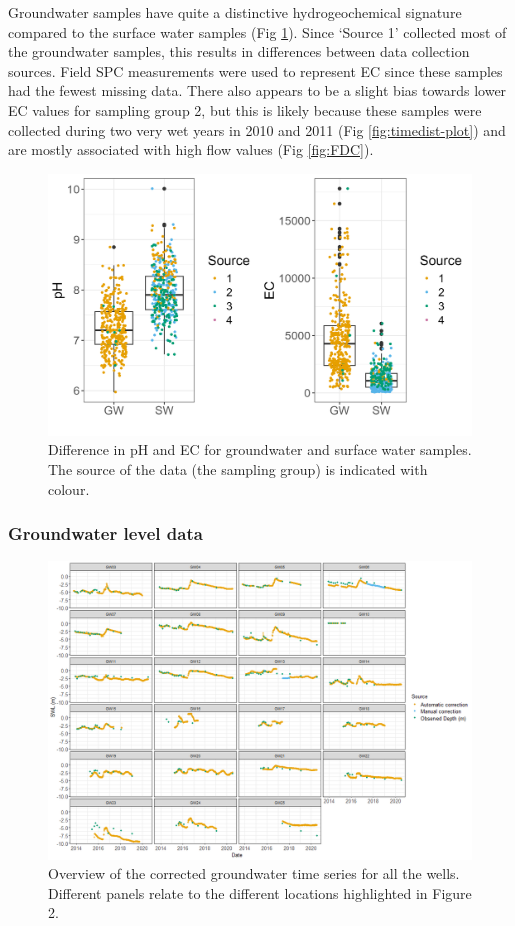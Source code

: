 \documentclass[, manuscript]{copernicus}
\begin{document}
Groundwater samples have quite a distinctive hydrogeochemical signature
compared to the surface water samples (Fig \ref{fig:gw_sw-plot}). Since
`Source 1' collected most of the groundwater samples, this results in
differences between data collection sources. Field SPC measurements were
used to represent EC since these samples had the fewest missing data.
There also appears to be a slight bias towards lower EC values for
sampling group 2, but this is likely because these samples were
collected during two very wet years in 2010 and 2011 (Fig
\ref{fig:timedist-plot}) and are mostly associated with high flow values
(Fig \ref{fig:FDC}).

\begin{figure}
\includegraphics[width=0.8\linewidth]{Figures/gwsw} \caption{Difference in pH and EC for groundwater and surface water samples. The source of the data (the sampling group) is indicated with colour.}\label{fig:gw_sw-plot}
\end{figure}

\subsubsection{Groundwater level data}

\begin{figure}
\includegraphics[width=1\linewidth]{Figures/Final_Corrected_piezodepths} \caption{Overview of the corrected groundwater time series for all the wells. Different panels relate to the different locations highlighted in Figure 2.}\label{fig:gw-series}
\end{figure}
\end{document}
